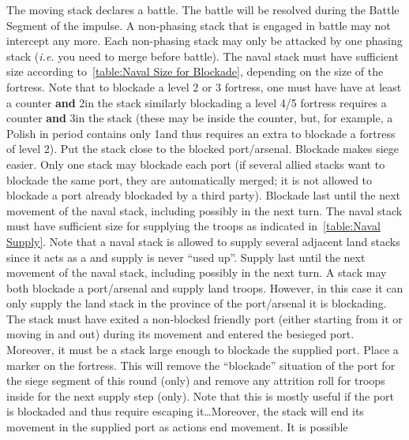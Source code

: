 
\label{chMilitary:Moves:Active Naval}
\bparag[Battle.] The moving stack declares a battle. The battle will be
resolved during the Battle Segment of the impulse. A non-phasing stack that is
engaged in battle may not intercept any more. Each non-phasing stack may only
be attacked by one phasing stack (\emph{i.e.} you need to merge before
battle).
 The naval stack must have
sufficient size according to~\ref{table:Naval Size for Blockade}, depending on
the size of the fortress. Note that to blockade a level 2 or 3 fortress, one
must have have at least a \FLEET\Facemoins counter \textbf{and} 2\ND in the
stack similarly blockading a level 4/5 fortress requires a \FLEET\Faceplus
counter \textbf{and} 3\ND in the stack (these \ND may be inside the \FLEET
counter, but, for example, a Polish \FLEET\Facemoins in period 
contains only 1\ND and thus requires an extra \ND to blockade a fortress of
level 2). Put the stack close to the blocked port/arsenal. Blockade makes
siege easier. Only one stack may blockade each port (if several allied stacks
want to blockade the same port, they are automatically merged; it is not
allowed to blockade a port already blockaded by a third party). Blockade last
until the next movement of the naval stack, including possibly in the next
turn.
 The naval stack must have sufficient size for
supplying the troops as indicated in~\ref{table:Naval Supply}. Note that a
naval stack is allowed to supply several adjacent land stacks since it acts as
a \SoS and supply is never ``used up''. Supply last until the next movement of
the naval stack, including possibly in the next turn.
 A stack may both blockade a port/arsenal and
supply land troops. However, in this case it can only supply the land stack in
the province of the port/arsenal it is blockading.
 The stack must have exited a non-blocked
friendly port (either starting from it or moving in and out) during its
movement and entered the besieged port. Moreover, it must be a stack large
enough to blockade the supplied port. Place a \SUPPLY marker on the
fortress. This will remove the ``blockade'' situation of the port for the
siege segment of this round (only) and remove any attrition roll for troops
inside for the next supply step (only). Note that this is mostly useful if the
port is blockaded and thus require escaping it\ldots Moreover, the stack will
end its movement in the supplied port as actions end movement. It is possible
